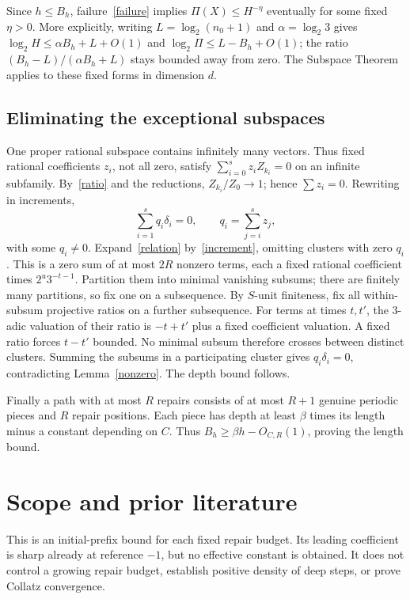 \documentclass[11pt]{article}
\begin{document}
Since $h\le B_h$, failure~\eqref{failure} implies
$\Pi(X)\le H^{-\eta}$ eventually for some fixed $\eta>0$.
More explicitly, writing $L=\log_2(n_0+1)$ and $\alpha=\log_2 3$ gives
$\log_2H\le\alpha B_h+L+O(1)$ and
$\log_2\Pi\le L-B_h+O(1)$; the ratio
$(B_h-L)/(\alpha B_h+L)$ stays bounded away from zero.
The Subspace Theorem applies to these fixed forms in dimension $d$.

\subsection{Eliminating the exceptional subspaces}
One proper rational subspace contains infinitely many vectors. Thus fixed rational coefficients $z_i$, not all zero, satisfy
$\sum_{i=0}^s z_iZ_{k_i}=0$ on an infinite subfamily.
By~\eqref{ratio} and the reductions, $Z_{k_i}/Z_0\to1$; hence $\sum z_i=0$. Rewriting in increments,
\begin{equation}\label{relation}
\sum_{i=1}^s q_i\delta_i=0,\qquad q_i=\sum_{j=i}^s z_j,
\end{equation}
with some $q_i\ne0$.
Expand~\eqref{relation} by~\eqref{increment}, omitting clusters with zero $q_i$. This is a zero sum of at most $2R$ nonzero terms, each a fixed rational coefficient times $2^u3^{-t-1}$. Partition them into minimal vanishing subsums; there are finitely many partitions, so fix one on a subsequence. By $S$-unit finiteness, fix all within-subsum projective ratios on a further subsequence.
For terms at times $t,t'$, the $3$-adic valuation of their ratio is $-t+t'$ plus a fixed coefficient valuation. A fixed ratio forces $t-t'$ bounded. No minimal subsum therefore crosses between distinct clusters. Summing the subsums in a participating cluster gives $q_i\delta_i=0$, contradicting Lemma~\ref{nonzero}. The depth bound follows.

Finally a path with at most $R$ repairs consists of at most $R+1$ genuine periodic pieces and $R$ repair positions. Each piece has depth at least $\beta$ times its length minus a constant depending on $C$. Thus $B_h\ge\beta h-O_{C,R}(1)$, proving the length bound.

\section{Scope and prior literature}
This is an initial-prefix bound for each fixed repair budget. Its leading coefficient is sharp already at reference $-1$, but no effective constant is obtained. It does not control a growing repair budget, establish positive density of deep steps, or prove Collatz convergence.
\end{document}

